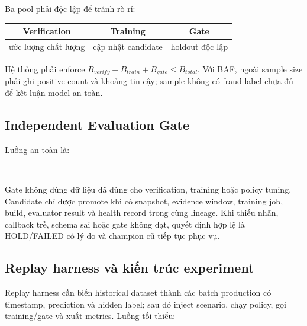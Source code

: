 Ba pool phải độc lập để tránh rò rỉ:

\begin{center}
\begin{tabular}{@{}ccc@{}}
\toprule
\textbf{Verification} & \textbf{Training} & \textbf{Gate}\\
\midrule
ước lượng chất lượng & cập nhật candidate & holdout độc lập\\
\bottomrule
\end{tabular}
\end{center}

Hệ thống phải enforce \(\mathit{B}_{verify}+\mathit{B}_{train}+\mathit{B}_{gate}\leq\mathit{B}_{total}\). Với BAF, ngoài sample size phải ghi positive count và khoảng tin cậy; sample không có fraud label chưa đủ để kết luận model an toàn.

\subsection{Independent Evaluation Gate}

Luồng an toàn là:

\begin{center}
\\
\end{center}

Gate không dùng dữ liệu đã dùng cho verification, training hoặc policy tuning. Candidate chỉ được promote khi có snapshot, evidence window, training job, build, evaluator result và health record trong cùng lineage. Khi thiếu nhãn, callback trễ, schema sai hoặc gate không đạt, quyết định hợp lệ là HOLD/FAILED có lý do và champion cũ tiếp tục phục vụ.

\subsection{Replay harness và kiến trúc experiment}

Replay harness cần biến historical dataset thành các batch production có timestamp, prediction và hidden label; sau đó inject scenario, chạy policy, gọi training/gate và xuất metrics. Luồng tối thiểu:

\begin{center}
\\
\\
\end{center}

